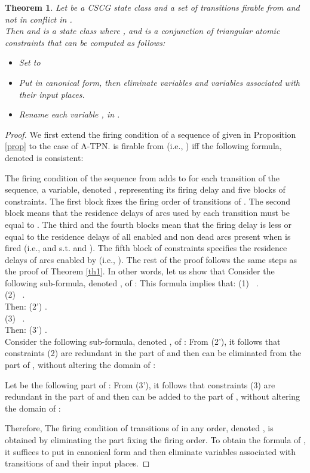 \documentclass[submission,copyright,creativecommons]{eptcs}
\newtheorem{theorem}{Theorem}
\newtheorem{proof}{Proof}
\numberwithin{equation}{section}
\begin{document}
\begin{theorem} \label{th2}
Let  be a CSCG state class and  a set of transitions firable from  and not in conflict in .\\ Then  and  is a state class  where ,  and  is a conjunction of triangular atomic constraints that can be computed as follows:
\begin{itemize}
\item Set  to 

\item Put  in canonical form, then eliminate variables  and variables associated with their input places. \item Rename each variable , in  .
\end{itemize}
\end{theorem}

  \begin{proof} We first extend the firing condition of a sequence  of  given in Proposition \ref{prop} to the case of A-TPN.  is firable from  (i.e., ) iff the following formula, denoted  is consistent:
 

The firing condition of the sequence  from  adds to  for each transition   of the sequence, a variable, denoted , representing its firing delay and five blocks of constraints. The first block fixes the firing order of transitions of . The second block means that the residence delays of arcs used by each transition  must be equal to . The third and the fourth blocks mean that the firing delay  is less or equal to the residence delays of all enabled and non dead arcs present when  is fired (i.e.,  and  s.t.  and ). The fifth block of constraints specifies the residence delays of arcs enabled by  (i.e., ). The rest of the proof follows the same steps as the proof of Theorem \ref{th1}. In other words, let us show that     
Consider the following sub-formula, denoted , of : 
This formula implies that:
(1) \ . \\
(2) \ .\\ Then: (2') .\\
(3) \ .\\ Then: (3') .\\
Consider the following sub-formula, denoted , of : 
From (2'), it follows that constraints (2) are redundant in the part  of  and then can be eliminated from the part  of , without altering the domain of :

Let  be the following part of : 
From (3'), it follows that constraints (3) are redundant in the part  of  and then can be added to the part  of , without altering the domain of :

Therefore,     
The firing condition of transitions of  in any order, denoted , is obtained by eliminating the part fixing the firing order. To obtain the formula of , it suffices to put  in canonical form and then eliminate variables associated with transitions of  and their input places. \normalsize
 \end{proof}
\end{document}
